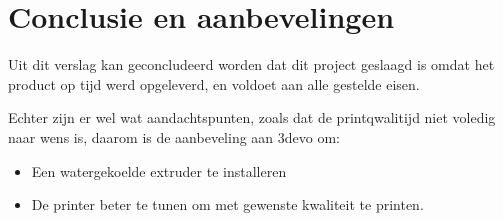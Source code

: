 \chapter{Conclusie en aanbevelingen}
\label{Conclusie_en_aanbevelingen}

Uit dit verslag kan geconcludeerd worden dat dit project geslaagd is omdat het
product op tijd werd opgeleverd, en voldoet aan alle gestelde eisen.

Echter zijn er wel wat aandachtspunten, zoals dat de printqwalitijd niet voledig
naar wens is, daarom is de aanbeveling aan 3devo om:

\begin{itemize}
    \item Een watergekoelde extruder te installeren
    \item De printer beter te tunen om met gewenste kwaliteit te printen.
\end{itemize}